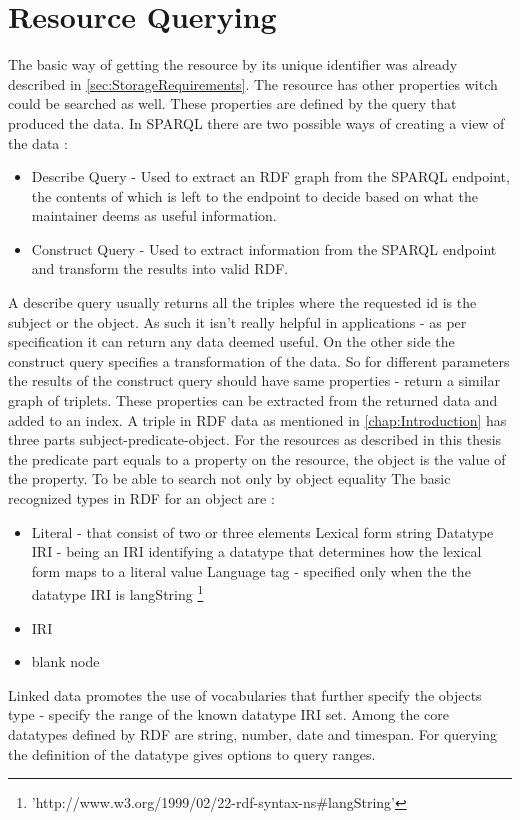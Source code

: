 \section{Resource Querying}
The basic way of getting the resource by its unique identifier was already described in \autoref{sec:StorageRequirements}. The resource has other properties witch could be searched as well. These properties are defined by the query that produced the data. In SPARQL there are two possible ways of creating a view of the data \cite{onlineSparqlQueryLanguageSpec}:
\begin{itemize}
	\item Describe Query - Used to extract an RDF graph from the SPARQL endpoint, the contents of which is left to the endpoint to decide based on what the maintainer deems as useful information.
	\item Construct Query - Used to extract information from the SPARQL endpoint and transform the results into valid RDF.
\end{itemize}
A describe query usually returns all the triples where the requested id is the subject or the object. As such it isn't really helpful in applications - as per specification it can return any data deemed useful. On the other side the construct query specifies a transformation of the data. So for different parameters the results of the construct query should have same properties - return a similar graph of triplets. These properties can be extracted from the returned data and added to an index. A triple in RDF data as mentioned in \autoref{chap:Introduction} has three parts subject-predicate-object. For the resources as described in this thesis the predicate part equals to a property on the resource, the object is the value of the property. To be able to search not only by object equality  The basic recognized types in RDF for an object are \cite{onlineRdfConcepts}:
\begin{itemize}
	\item Literal - that consist of two or three elements %
		\subitem Lexical form string
		\subitem Datatype IRI - being an IRI identifying a datatype that determines how the lexical form maps to a literal value
		\subitem Language tag - specified only when the the datatype IRI is langString \footnote{'http://www.w3.org/1999/02/22-rdf-syntax-ns\#langString'}
	\item IRI
	\item blank node
\end{itemize}
Linked data promotes the use of vocabularies %
that further specify the objects type - specify the range of the known datatype IRI set.
Among the core datatypes defined by RDF are string, number, date and timespan. For querying the definition of the datatype gives options to query ranges.

